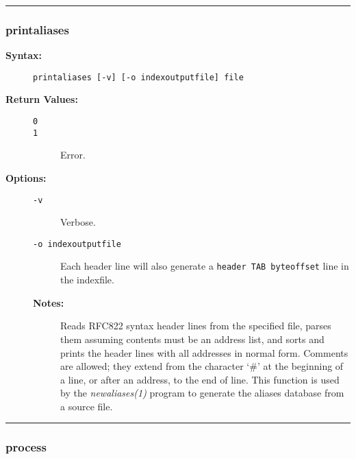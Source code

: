\hrule
\subsubsection{printaliases}

\begin{description}
\item[{\bf Syntax:}] \mbox{}

{\tt printaliases [-v] [-o indexoutputfile] file}

\item[{\bf Return Values:}] \mbox{}

\begin{description}
\item[{\tt 0}] \mbox{}



\item[{\tt 1}] \mbox{}

Error.

\end{description}


\item[{\bf Options:}] \mbox{}

\begin{description}
\item[{\tt -v}] \mbox{}

Verbose.

\item[{\tt -o indexoutputfile}] \mbox{}

Each header line will also generate 
a {\tt header TAB byteoffset} line in the indexfile.

\item[{\bf Notes:}] \mbox{}

Reads RFC822 syntax header lines from the specified
file, parses them assuming contents must be an address list, and sorts 
and prints the header lines with all addresses in normal form. Comments 
are allowed; they extend from the character `\#' at the beginning of 
a line, or after an address, to the end of line. This function is used 
by the {\em newaliases(1)\/} program to generate the aliases database 
from a source file.

\end{description}


\end{description}


\hrule
\subsubsection{process}

